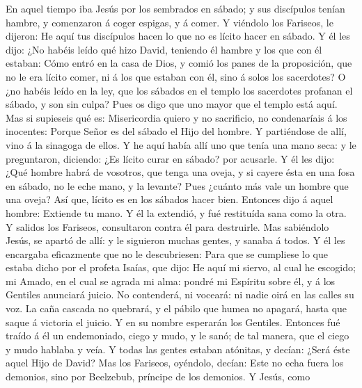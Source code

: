  En aquel tiempo iba Jesús por los sembrados en sábado; y
sus discípulos tenían hambre, y comenzaron á coger espigas, y á comer.
 Y viéndolo los Fariseos, le dijeron: He aquí tus
discípulos hacen lo que no es lícito hacer en sábado.  Y
él les dijo: ¿No habéis leído qué hizo David, teniendo él hambre y los
que con él estaban:  Cómo entró en la casa de Dios, y
comió los panes de la proposición, que no le era lícito comer, ni á los
que estaban con él, sino á solos los sacerdotes?  O ¿no
habéis leído en la ley, que los sábados en el templo los sacerdotes
profanan el sábado, y son sin culpa?  Pues os digo que uno
mayor que el templo está aquí.  Mas si supieseis qué es:
Misericordia quiero y no sacrificio, no condenaríais á los inocentes:
 Porque Señor es del sábado el Hijo del hombre.
 Y partiéndose de allí, vino á la sinagoga de ellos.
 Y he aquí había allí uno que tenía una mano seca: y le
preguntaron, diciendo: ¿Es lícito curar en sábado? por acusarle.
 Y él les dijo: ¿Qué hombre habrá de vosotros, que tenga
una oveja, y si cayere ésta en una fosa en sábado, no le eche mano, y la
levante?  Pues ¿cuánto más vale un hombre que una oveja?
Así que, lícito es en los sábados hacer bien.  Entonces
dijo á aquel hombre: Extiende tu mano. Y él la extendió, y fué
restituída sana como la otra.  Y salidos los Fariseos,
consultaron contra él para destruirle.  Mas sabiéndolo
Jesús, se apartó de allí: y le siguieron muchas gentes, y sanaba á
todos.  Y él les encargaba eficazmente que no le
descubriesen:  Para que se cumpliese lo que estaba dicho
por el profeta Isaías, que dijo:  He aquí mi siervo, al
cual he escogido; mi Amado, en el cual se agrada mi alma: pondré mi
Espíritu sobre él, y á los Gentiles anunciará juicio.  No
contenderá, ni voceará: ni nadie oirá en las calles su voz.
 La caña cascada no quebrará, y el pábilo que humea no
apagará, hasta que saque á victoria el juicio.  Y en su
nombre esperarán los Gentiles.  Entonces fué traído á él
un endemoniado, ciego y mudo, y le sanó; de tal manera, que el ciego y
mudo hablaba y veía.  Y todas las gentes estaban
atónitas, y decían: ¿Será éste aquel Hijo de David?  Mas
los Fariseos, oyéndolo, decían: Este no echa fuera los demonios, sino
por Beelzebub, príncipe de los demonios.  Y Jesús, como

